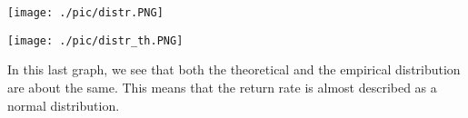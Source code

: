 \documentclass[a4paper,11pt,twoside]{article}
\begin{document}
\begin{center}
	\texttt{[image: ./pic/distr.PNG]}
\end{center}

\begin{center}
	\texttt{[image: ./pic/distr\_th.PNG]}
\end{center}

In this last graph, we see that both the theoretical and the empirical distribution are about the same. This means that the return rate is almost described as a normal distribution.






\end{document}
